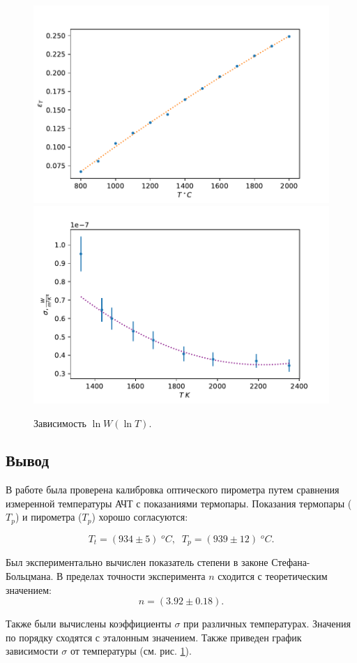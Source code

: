 \documentclass[12pt,a4paper]{article}
\begin{document}
\begin{figure}[h]
	\includegraphics[scale=1.2, width=0.47\linewidth]{gen/fig-epsilon.pdf}\hfill
	\includegraphics[scale=1.2, width=0.47\linewidth]{gen/fig-sigma.pdf}
	\caption{Зависимость $\ln W ( \ln T).$}
	\label{fig:sigma}
\end{figure}

\subsection*{Вывод}

В работе была проверена калибровка оптического пирометра путем сравнения измеренной температуры АЧТ с показаниями термопары. Показания термопары ($T_p$) и пирометра ($T_p$) хорошо согласуются:

$$T_t = (934 \pm 5)\;^oC,\;\; T_p = (939 \pm 12)\;^oC.$$

Был экспериментально вычислен показатель степени в законе Стефана-Больцмана. В пределах точности эксперимента $n$ сходится с теоретическим значением:
$$n = (3.92 \pm 0.18).$$

Также были вычислены коэффициенты $\sigma$ при различных температурах. Значения по порядку сходятся с эталонным значением. Также приведен график зависимости $\sigma$ от температуры (см. рис. \ref{fig:sigma}).

	
\end{document}
